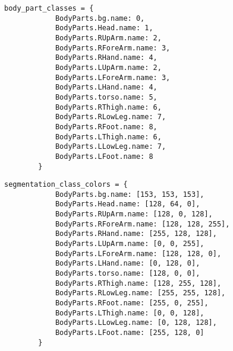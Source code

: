 \begin{figure}

    \fontsmall
\begin{minipage}{0.29\linewidth}
    \begin{Verbatim}[frame=topline,label=Mapping to classes,framesep=3mm]
        body_part_classes = {
            BodyParts.bg.name: 0,
            BodyParts.Head.name: 1,
            BodyParts.RUpArm.name: 2,
            BodyParts.RForeArm.name: 3,
            BodyParts.RHand.name: 4,
            BodyParts.LUpArm.name: 2,
            BodyParts.LForeArm.name: 3,
            BodyParts.LHand.name: 4,
            BodyParts.torso.name: 5,
            BodyParts.RThigh.name: 6,
            BodyParts.RLowLeg.name: 7,
            BodyParts.RFoot.name: 8,
            BodyParts.LThigh.name: 6,
            BodyParts.LLowLeg.name: 7,
            BodyParts.LFoot.name: 8
        }
    \end{Verbatim}
    \label{fig:test1}
\end{minipage}\hfill
\begin{minipage}{0.49\linewidth}
    \begin{Verbatim}[frame=topline,label=Mapping to RGB values, framesep=3mm]
        segmentation_class_colors = {
            BodyParts.bg.name: [153, 153, 153],
            BodyParts.Head.name: [128, 64, 0],
            BodyParts.RUpArm.name: [128, 0, 128],
            BodyParts.RForeArm.name: [128, 128, 255],
            BodyParts.RHand.name: [255, 128, 128],
            BodyParts.LUpArm.name: [0, 0, 255],
            BodyParts.LForeArm.name: [128, 128, 0],
            BodyParts.LHand.name: [0, 128, 0],
            BodyParts.torso.name: [128, 0, 0],
            BodyParts.RThigh.name: [128, 255, 128],
            BodyParts.RLowLeg.name: [255, 255, 128],
            BodyParts.RFoot.name: [255, 0, 255],
            BodyParts.LThigh.name: [0, 0, 128],
            BodyParts.LLowLeg.name: [0, 128, 128],
            BodyParts.LFoot.name: [255, 128, 0]
        }
    \end{Verbatim}
     \label{fig:test}
\end{minipage}
    \label{fig:test21}
    \end{figure}


